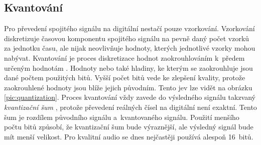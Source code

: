 \subsection*{Kvantování}
\label{sub:quantization}

Pro převedení spojitého signálu na digitální nestačí pouze vzorkování.
Vzorkování diskretizuje časovou komponentu spojitého signálu na pevně daný
počet vzorků za jednotku času, ale nijak neovlivňuje hodnoty, kterých
jednotlivé vzorky mohou nabývat. Kvantování je proces diskretizace hodnot
zaokrouhlováním k~předem určeným hodnotám \cite{Oliver1948}. Hodnoty nebo také
hladiny, ke kterým se zaokrouhluje jsou dané počtem použitých bitů. Vyšší počet
bitů vede ke zlepšení kvality, protože zaokrouhlené hodnoty jsou blíže jejich
původním. Tento jev lze vidět na obrázku \ref{pic:quantization}. Proces
kvantování vždy zavede do výsledného signálu takzvaný \textit{kvantizační šum}
\cite{Oliver1948}, protože převedení reálných čísel na digitální není exaktní.
Tento šum je rozdílem původního signálu a~kvantovaného signálu. Použití menšího
počtu bitů způsobí, že kvantizační šum bude výraznější, ale výsledný signál
bude mít menší velikost. Pro kvalitní audio se dnes nejčastěji používá alespoň
16~bitů.

